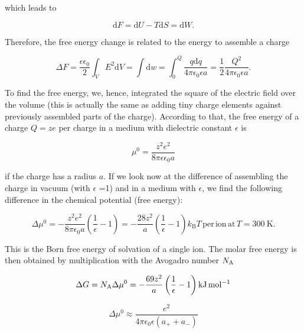 \documentclass[letterpaper,10pt,english]{sphinxmanual}
\begin{document}
\sphinxAtStartPar
which leads to

\sphinxAtStartPar
\begin{equation}
\mathrm dF=\mathrm dU-T\mathrm dS=\mathrm dW.
\end{equation}

\sphinxAtStartPar
Therefore, the free energy change is related to the energy to assemble a charge

\sphinxAtStartPar
\begin{equation}
\Delta F=\frac{\epsilon \epsilon_{0}}{2}\int_{V}E^{2}\mathrm dV=\int \mathrm dw=\int_0^Q\frac{q\mathrm dq}{4\pi\epsilon_0\epsilon a}=\frac{1}{2}\frac{Q^2}{4\pi\epsilon_0\epsilon a}.
\end{equation}

\sphinxAtStartPar
To find the free energy, we, hence, integrated the square of the electric field over the volume (this is actually the same as adding tiny charge elements against previously assembled parts of the charge). According to that, the free energy of a charge \(Q=z e\) per charge in a medium with dielectric constant \(\epsilon\) is

\sphinxAtStartPar
\begin{equation}
\mu^{0}=\frac{z^2e^2}{8\pi \epsilon \epsilon_{0}a}
\end{equation}

\sphinxAtStartPar
if the charge has a radius \(a\). If we look now at the difference of assembling the charge in vacuum (with \(\epsilon\) =1) and in a medium with \(\epsilon\), we find the following difference in the chemical potential (free energy):

\sphinxAtStartPar
\begin{equation}
\Delta \mu^{0}=-\frac{z^2e^2}{8\pi \epsilon_{0}a}\left (\frac{1}{\epsilon}-1\right )=-\frac{28z^2}{a}\left (\frac{1}{\epsilon}-1\right )k_\mathrm{B}T\mathrm{\, per\,ion\, at\,}T=300~\mathrm{K}.
\end{equation}

\sphinxAtStartPar
This is the Born free energy of solvation of a single ion. The molar free energy is then obtained by multiplication with the Avogadro number \(N_{\rm A}\)

\sphinxAtStartPar
\begin{equation}
\Delta G=N_{\rm A}\Delta \mu^{0}=-\frac{69z^2}{a}\left (\frac{1}{\epsilon}-1\right )\mathrm{kJ\,mol^{-1}}
\end{equation}

\sphinxAtStartPar
\begin{equation}
\Delta \mu^{0}\approx \frac{e^2}{4\pi\epsilon_{0}\epsilon (a_{+}+a_{-})}
\end{equation}
\end{document}
